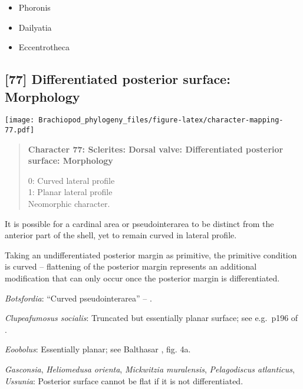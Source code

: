 \documentclass[openany]{book}
\providecommand{\tightlist}{%
  \setlength{\itemsep}{0pt}\setlength{\parskip}{0pt}}
\theoremstyle{definition}
\theoremstyle{definition}
\theoremstyle{definition}
\theoremstyle{remark}
\begin{document}
\begin{itemize}
\tightlist
\item
  Phoronis\\
\item
  Dailyatia\\
\item
  Eccentrotheca
\end{itemize}

\subsection*{{[}77{]} Differentiated posterior surface:
Morphology}\label{differentiated-posterior-surface-morphology}

\texttt{[image: Brachiopod\_phylogeny\_files/figure-latex/character-mapping-77.pdf]}

\begin{quote}
\textbf{Character 77: Sclerites: Dorsal valve: Differentiated posterior
surface: Morphology}

0: Curved lateral profile\\
1: Planar lateral profile\\
Neomorphic character.
\end{quote}

It is possible for a cardinal area or pseudointerarea to be distinct
from the anterior part of the shell, yet to remain curved in lateral
profile.

Taking an undifferentiated posterior margin as primitive, the primitive
condition is curved -- flattening of the posterior margin represents an
additional modification that can only occur once the posterior margin is
differentiated.

\hypertarget{Botsfordia-coding-77}{}
\emph{Botsfordia}: ``Curved pseudointerarea'' --
\citet{Skovsted2017Depthrelated}.

\hypertarget{Clupeafumosus_socialis-coding-77}{}
\emph{Clupeafumosus socialis}: Truncated but essentially planar surface;
see e.g.~p196 of \citet{Topper2013Reappraisalof}.

\hypertarget{Eoobolus-coding-77}{}
\emph{Eoobolus}: Essentially planar; see Balthasar
\citeyearpar{Balthasar2009Thebrachiopod}, fig. 4a.

\hypertarget{Gasconsia-coding-77}{}
\emph{Gasconsia}, \emph{Heliomedusa orienta}, \emph{Mickwitzia
muralensis}, \emph{Pelagodiscus atlanticus}, \emph{Ussunia}: Posterior
surface cannot be flat if it is not differentiated.
\end{document}
